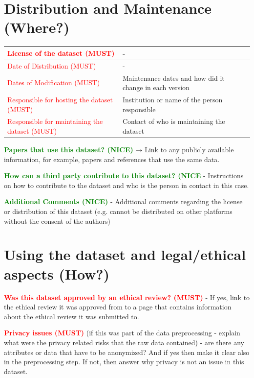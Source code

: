 \documentclass[letterpaper,11pt]{article}
\begin{document}
\section{Distribution and Maintenance (Where?)}

\begin{table}[htb]
\begin{tabular}{|l|l|}
\hline
\textcolor{red}{License of the dataset (MUST)} & - \\ \hline
\textcolor{red}{Date of Distribution (MUST)} & -  \\ \hline
\textcolor{red}{Dates of Modification (MUST)} & Maintenance dates and how did it change in each version \\ \hline
\textcolor{red}{Responsible for hosting the dataset (MUST)} & Institution or name of the person responsible\\ \hline
\textcolor{red}{Responsible for maintaining the dataset (MUST)} &  Contact of who is maintaining the dataset\\ \hline
\end{tabular}
\end{table}

\textbf{\textcolor{green}{Papers that use this dataset? (NICE)}} → Link to any publicly available information, for example, papers and references that use the same data. 

\textbf{\textcolor{green}{How can a third party contribute to this dataset? (NICE}} - Instructions on how to contribute to the dataset and who is the person in contact in this case.

\textbf{\textcolor{green}{Additional Comments (NICE)}} - Additional comments regarding the license or distribution of this dataset (e.g. cannot be distributed on other platforms without the consent of the authors)

\section{Using the dataset and legal/ethical aspects (How?)}

\textbf{\textcolor{red}{Was this dataset approved by an ethical review? (MUST)}} - If yes, link to the ethical review it was approved from to a page that contains information about the ethical review it was submitted to. 


\textbf{\textcolor{red}{Privacy issues (MUST)}}  (if this was part of the data preprocessing - explain what were the privacy related risks that the raw data contained) - are there any attributes or data that have to be anonymized? And if yes then make it clear also in the preprocessing step. If not, then answer why privacy is not an issue in this dataset. 
\end{document}
